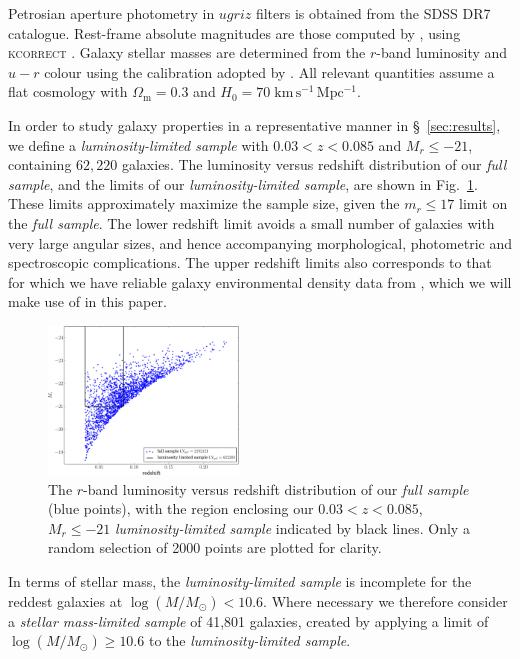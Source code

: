 \documentclass[useAMS,usenatbib]{mn2e}
\begin{document}
Petrosian aperture photometry in $ugriz$ filters is obtained from the SDSS DR7 catalogue. Rest-frame absolute magnitudes are those computed by \citet{Bamford_09}, using \textsc{kcorrect} \citep{Blanton_07}. Galaxy stellar masses are determined from the $r$-band luminosity and $u-r$ colour using the calibration adopted by \citet{Baldry_06}.
All relevant quantities assume a flat cosmology with $\Omega_\mathrm{m} = 0.3$ and $H_0 = 70\;\mathrm{km\,s^{-1}\,Mpc^{-1}}$.

In order to study galaxy properties in a representative manner in \S~\ref{sec:results}, we define a \textit{luminosity-limited sample} with $0.03<z<0.085$ and $M_r \le -21$, containing $62,220$ galaxies. The luminosity versus redshift distribution of our \textit{full sample}, and the limits of our \textit{luminosity-limited sample}, are shown in Fig.~\ref{fig:vl_sample}.  These limits approximately maximize the sample size, given the $m_r \le 17$ limit on the \textit{full sample}. The lower redshift limit avoids a small number of galaxies with very large angular sizes, and hence accompanying morphological, photometric and spectroscopic complications. The upper redshift limits also corresponds to that for which we have reliable galaxy environmental density data from \cite{Baldry_06}, which we will make use of in this paper.  

\begin{figure}
		\centering
		\includegraphics[width=0.45\textwidth]{Images/Data/volume_limited_sample.pdf}
    \caption{The $r$-band luminosity versus redshift distribution of our \textit{full sample} (blue points), with the region enclosing our $0.03<z<0.085$, $M_r  \leq -21$ \textit{luminosity-limited sample} indicated by black lines. Only a random selection of 2000 points are plotted for clarity.
		\label{fig:vl_sample}}
\end{figure}

In terms of stellar mass, the \textit{luminosity-limited sample} is incomplete for the reddest galaxies at $\log (M/M_{\odot}) < 10.6$. Where necessary we therefore consider a \textit{stellar mass-limited sample} of 41,801 galaxies, created by applying a limit of $\log (M/M_{\odot}) \geq 10.6$ to the \textit{luminosity-limited sample}.
\end{document}
